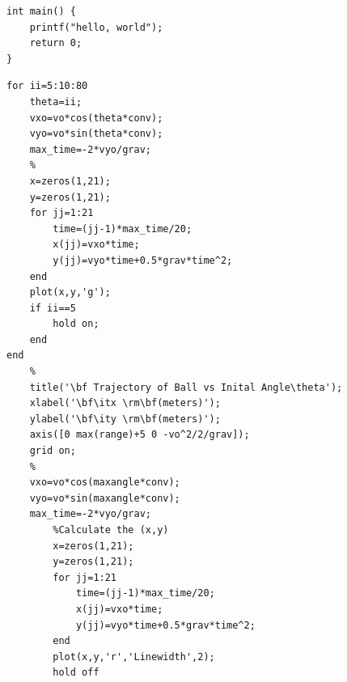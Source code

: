 \documentclass[UTF8]{ctexart}
\begin{document}
\begin{verbatim}  
int main() {  
    printf("hello, world");  
    return 0;  
}  
\end{verbatim}  

\begin{verbatim}
for ii=5:10:80
    theta=ii;
    vxo=vo*cos(theta*conv);
    vyo=vo*sin(theta*conv);
    max_time=-2*vyo/grav;
    %
    x=zeros(1,21);
    y=zeros(1,21);
    for jj=1:21
        time=(jj-1)*max_time/20;
        x(jj)=vxo*time;
        y(jj)=vyo*time+0.5*grav*time^2;
    end
    plot(x,y,'g');
    if ii==5
        hold on;
    end
end
    %
    title('\bf Trajectory of Ball vs Inital Angle\theta');
    xlabel('\bf\itx \rm\bf(meters)');
    ylabel('\bf\ity \rm\bf(meters)');
    axis([0 max(range)+5 0 -vo^2/2/grav]);
    grid on;
    %
    vxo=vo*cos(maxangle*conv);
    vyo=vo*sin(maxangle*conv);
    max_time=-2*vyo/grav;
        %Calculate the (x,y)
        x=zeros(1,21);
        y=zeros(1,21);
        for jj=1:21
            time=(jj-1)*max_time/20;
            x(jj)=vxo*time;
            y(jj)=vyo*time+0.5*grav*time^2;
        end
        plot(x,y,'r','Linewidth',2);
        hold off

\end{verbatim}


%
\end{document}
